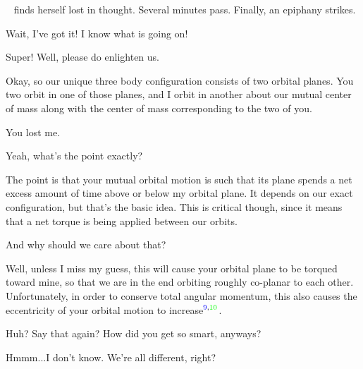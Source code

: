 \documentclass[main.tex]{subfiles}
\begin{document}
\par \nar \rmcelaeno~ finds herself lost in thought.  Several minutes pass.  Finally, an epiphany strikes.

\par \Celaeno  Wait, I've got it!  I know what is going on!

\par \Taygete  Super!  Well, please do enlighten us.

\par \Celaeno  Okay, so our unique three body configuration consists of two orbital planes.  You two orbit in one of those planes, and I orbit in another about our mutual center of mass along with the center of mass corresponding to the two of you.

\par \Alcyone  You lost me.

\par \Taygete Yeah, what's the point exactly?

\par \Celaeno The point is that your mutual orbital motion is such that its plane spends a net excess amount of time above or below my orbital plane.  It depends on our exact configuration, but that's the basic idea.  This is critical though, since it means that a net torque is being applied between our orbits.




\par \Alcyone And why should we care about that?

\par \Celaeno Well, unless I miss my guess, this will cause your orbital plane to be torqued toward mine, so that we are in the end orbiting roughly co-planar to each other.  Unfortunately, in order to conserve total angular momentum, this also causes the eccentricity of your orbital motion to increase$^{\textcolor{blue}{9},\textcolor{green}{10}}$.  

\par \Taygete  Huh?  Say that again?  How did you get so smart, anyways?

\par \Celaeno Hmmm...I don't know.  We're all different, right? 
\end{document}
